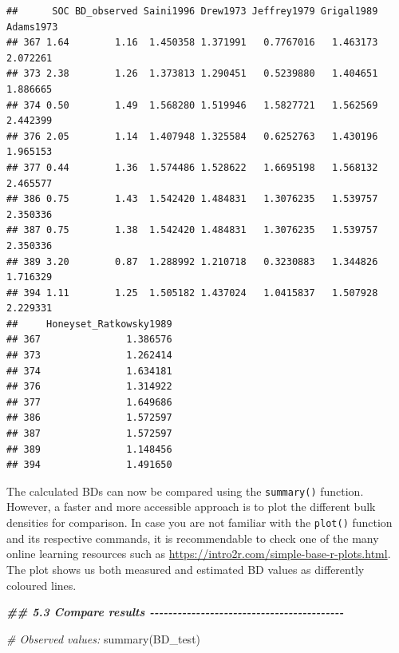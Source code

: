 \documentclass[
  10pt,
  b5paper,
  oneside]{book}
\newenvironment{Shaded}{\begin{snugshade}}{\end{snugshade}}
\newcommand{\CommentTok}[1]{\textcolor[rgb]{0.56,0.35,0.01}{\textit{#1}}}
\newcommand{\DocumentationTok}[1]{\textcolor[rgb]{0.56,0.35,0.01}{\textbf{\textit{#1}}}}
\newcommand{\FunctionTok}[1]{\textcolor[rgb]{0.00,0.00,0.00}{#1}}
\newcommand{\NormalTok}[1]{#1}
\begin{document}
\begin{verbatim}
##      SOC BD_observed Saini1996 Drew1973 Jeffrey1979 Grigal1989 Adams1973
## 367 1.64        1.16  1.450358 1.371991   0.7767016   1.463173  2.072261
## 373 2.38        1.26  1.373813 1.290451   0.5239880   1.404651  1.886665
## 374 0.50        1.49  1.568280 1.519946   1.5827721   1.562569  2.442399
## 376 2.05        1.14  1.407948 1.325584   0.6252763   1.430196  1.965153
## 377 0.44        1.36  1.574486 1.528622   1.6695198   1.568132  2.465577
## 386 0.75        1.43  1.542420 1.484831   1.3076235   1.539757  2.350336
## 387 0.75        1.38  1.542420 1.484831   1.3076235   1.539757  2.350336
## 389 3.20        0.87  1.288992 1.210718   0.3230883   1.344826  1.716329
## 394 1.11        1.25  1.505182 1.437024   1.0415837   1.507928  2.229331
##     Honeyset_Ratkowsky1989
## 367               1.386576
## 373               1.262414
## 374               1.634181
## 376               1.314922
## 377               1.649686
## 386               1.572597
## 387               1.572597
## 389               1.148456
## 394               1.491650
\end{verbatim}

The calculated BDs can now be compared using the \texttt{summary()} function. However, a faster and more accessible approach is to plot the different bulk densities for comparison. In case you are not familiar with the \texttt{plot()} function and its respective commands, it is recommendable to check one of the many online learning resources such as \url{https://intro2r.com/simple-base-r-plots.html}. The plot shows us both measured and estimated BD values as differently coloured lines.

\begin{Shaded}
\begin{Highlighting}[]
\DocumentationTok{\#\# 5.3 Compare results {-}{-}{-}{-}{-}{-}{-}{-}{-}{-}{-}{-}{-}{-}{-}{-}{-}{-}{-}{-}{-}{-}{-}{-}{-}{-}{-}{-}{-}{-}{-}{-}{-}{-}{-}{-}{-}{-}{-}{-}{-}{-}}

\CommentTok{\# Observed values:}
\FunctionTok{summary}\NormalTok{(BD\_test)}
\end{Highlighting}
\end{Shaded}
\end{document}
